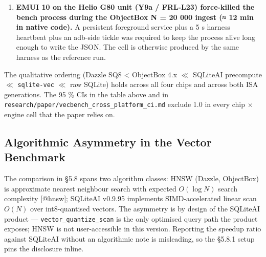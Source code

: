 \begin{enumerate}
  \textbf{EMUI 10 packaging note}: collecting the FRL-L23 round 2
  baseline-forced data point required bypassing \texttt{adb\ install\ -r} (which
  refused with \texttt{DELETE\_FAILED\_INTERNAL\_ERROR} on five consecutive
  attempts across two reboot cycles and an \texttt{adb\ kill-server} reset) and
  using the multi-step
  \texttt{cmd\ package\ install-create\ /\ install-write\ /\ install-commit}
  flow directly through \texttt{adb\ shell}. The behaviour is documented Huawei
  iAware interaction with the package-installer service; the reproducer is in
  \texttt{experiment/storage/android/README.md}. No algorithmic finding is
  contingent on this workaround --- we report it for benchmarkers who hit the
  same lock.
\item
  \textbf{EMUI 10 on the Helio G80 unit (Y9a / FRL-L23) force-killed the bench
  process during the ObjectBox N = 20 000 ingest (≈ 12 min in native code).} A
  persistent foreground service plus a 5 s harness heartbeat plus an adb-side
  tickle was required to keep the process alive long enough to write the JSON.
  The cell is otherwise produced by the same harness as the reference run.
\end{enumerate}

The qualitative ordering (Dazzle SQ8 \textless{} ObjectBox 4.x \(\ll\) SQLiteAI
precompute \(\ll\) \texttt{sqlite-vec} \(\ll\) raw SQLite) holds across all four
chips and across both ISA generations. The 95 \% CIs in the table above and in
\texttt{research/paper/vecbench\_cross\_platform\_ci.md} exclude 1.0 in every
chip × engine cell that the paper relies on.

\subsection{Algorithmic Asymmetry in the Vector
Benchmark}\label{algorithmic-asymmetry-in-the-vector-benchmark}

The comparison in §5.8 spans two algorithm classes: HNSW (Dazzle, ObjectBox) is
approximate nearest neighbour search with expected \(O(\log N)\) search
complexity {[}@hnsw{]}; SQLiteAI v0.9.95 implements SIMD-accelerated linear scan
\(O(N)\) over int8-quantised vectors. The asymmetry is by design of the SQLiteAI
product --- \texttt{vector\_quantize\_scan} is the only optimised query path the
product exposes; HNSW is not user-accessible in this version. Reporting the
speedup ratio against SQLiteAI without an algorithmic note is misleading, so the
§5.8.1 setup pins the disclosure inline.

